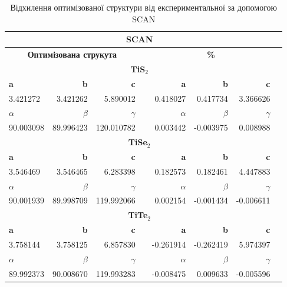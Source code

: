 \begin{table}[!htp]\centering
\scriptsize
\begin{tabular}{lrrrrrrr}\toprule
\multicolumn{7}{c}{\textbf{SCAN}} \\\midrule
\multicolumn{3}{c}{\textbf{Оптимізована струкута}} & &\multicolumn{3}{c}{\textbf{\%}} \\
\multicolumn{7}{c}{\textbf{TiS$_2$}} \\
\textbf{a} &\textbf{b} &\textbf{c} & &\textbf{a} &\textbf{b} &\textbf{c} \\
3.421272 &3.421262 &5.890012 & &0.418027 &0.417734 &3.366626 \\
\textbf{$\alpha$} &\textbf{$\beta$} &\textbf{$\gamma$} & &\textbf{$\alpha$} &\textbf{$\beta$} &\textbf{$\gamma$} \\
90.003098 &89.996423 &120.010782 & &0.003442 &-0.003975 &0.008988 \\
\multicolumn{7}{c}{\textbf{TiSe$_2$}} \\
\textbf{a} &\textbf{b} &\textbf{c} & &\textbf{a} &\textbf{b} &\textbf{c} \\
3.546469 &3.546465 &6.283398 & &0.182573 &0.182461 &4.447883 \\
\textbf{$\alpha$} &\textbf{$\beta$} &\textbf{$\gamma$} & &\textbf{$\alpha$} &\textbf{$\beta$} &\textbf{$\gamma$} \\
90.001939 &89.998709 &119.992066 & &0.002154 &-0.001434 &-0.006611 \\
\multicolumn{7}{c}{\textbf{TiTe$_2$}} \\
\textbf{a} &\textbf{b} &\textbf{c} & &\textbf{a} &\textbf{b} &\textbf{c} \\
3.758144 &3.758125 &6.857830 & &-0.261914 &-0.262419 &5.974397 \\
\textbf{$\alpha$} &\textbf{$\beta$} &\textbf{$\gamma$} & &\textbf{$\alpha$} &\textbf{$\beta$} &\textbf{$\gamma$} \\
89.992373 &90.008670 &119.993283 & &-0.008475 &0.009633 &-0.005596 \\
\bottomrule
\end{tabular}
\caption{Відхилення оптимізованої структури від експериментальної за допомогою SCAN}\label{tab:SCANlat}
\end{table}

